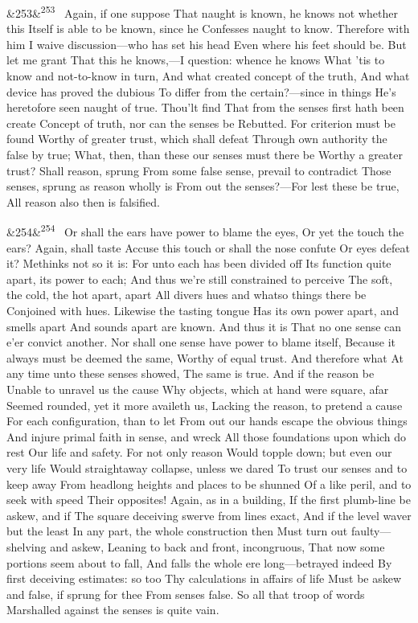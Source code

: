 \documentclass[12pt]{article}
\newcommand{\para}[1][]{\par\noindent\ifx&#1&\else\textsuperscript{\footnotesize #1}~\fi}
\begin{document}
\para[253] Again, if one suppose That naught is known, he knows not whether this Itself is able to be known, since he Confesses naught to know. Therefore with him I waive discussion---who has set his head Even where his feet should be. But let me grant That this he knows,---I question: whence he knows What 'tis to know and not-to-know in turn, And what created concept of the truth, And what device has proved the dubious To differ from the certain?---since in things He's heretofore seen naught of true. Thou'lt find That from the senses first hath been create Concept of truth, nor can the senses be Rebutted. For criterion must be found Worthy of greater trust, which shall defeat Through own authority the false by true; What, then, than these our senses must there be Worthy a greater trust? Shall reason, sprung From some false sense, prevail to contradict Those senses, sprung as reason wholly is From out the senses?---For lest these be true, All reason also then is falsified.

\para[254] Or shall the ears have power to blame the eyes, Or yet the touch the ears? Again, shall taste Accuse this touch or shall the nose confute Or eyes defeat it? Methinks not so it is: For unto each has been divided off Its function quite apart, its power to each; And thus we're still constrained to perceive The soft, the cold, the hot apart, apart All divers hues and whatso things there be Conjoined with hues. Likewise the tasting tongue Has its own power apart, and smells apart And sounds apart are known. And thus it is That no one sense can e'er convict another. Nor shall one sense have power to blame itself, Because it always must be deemed the same, Worthy of equal trust. And therefore what At any time unto these senses showed, The same is true. And if the reason be Unable to unravel us the cause Why objects, which at hand were square, afar Seemed rounded, yet it more availeth us, Lacking the reason, to pretend a cause For each configuration, than to let From out our hands escape the obvious things And injure primal faith in sense, and wreck All those foundations upon which do rest Our life and safety. For not only reason Would topple down; but even our very life Would straightaway collapse, unless we dared To trust our senses and to keep away From headlong heights and places to be shunned Of a like peril, and to seek with speed Their opposites! Again, as in a building, If the first plumb-line be askew, and if The square deceiving swerve from lines exact, And if the level waver but the least In any part, the whole construction then Must turn out faulty---shelving and askew, Leaning to back and front, incongruous, That now some portions seem about to fall, And falls the whole ere long---betrayed indeed By first deceiving estimates: so too Thy calculations in affairs of life Must be askew and false, if sprung for thee From senses false. So all that troop of words Marshalled against the senses is quite vain.
\end{document}
